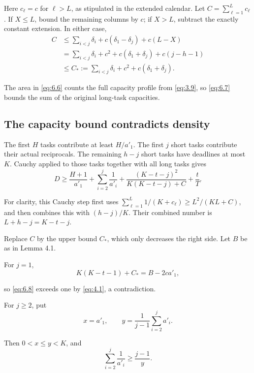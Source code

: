 \documentclass[11pt,a4paper]{article}
\begin{document}
Here \(c_\ell=c\) for \(\ell>L\), as stipulated in the extended calendar. Let \(C=\sum_{\ell=1}^L c_\ell\). If \(X\le L\), bound the remaining columns by \(c\); if \(X>L\), subtract the exactly constant extension. In either case,
\begin{equation}
\begin{aligned}
C
&\le\sum_{i<j}\delta_i+c(\delta_1-\delta_j)+c(L-X)\\
&=\sum_{i<j}\delta_i+c^2+c(\delta_1+\delta_j)+c(j-h-1)\\
&\le C_*:=\sum_{i<j}\delta_i+c^2+c(\delta_1+\delta_j).
\end{aligned}
\tag{6.7}
\label{eq:6.7}
\end{equation}

The area in \eqref{eq:6.6} counts the full capacity profile from \eqref{eq:3.9}, so \eqref{eq:6.7} bounds the sum of the original long-task capacities.

\hypertarget{the-capacity-bound-contradicts-density}{%
\subsection{The capacity bound contradicts density}\label{the-capacity-bound-contradicts-density}}

The first \(H\) tasks contribute at least \(H/a'_1\). The first \(j\) short tasks contribute their actual reciprocals. The remaining \(h-j\) short tasks have deadlines at most \(K\). Cauchy applied to those tasks together with all long tasks gives
\begin{equation}
D\ge
\frac{H+1}{a'_1}+\sum_{i=2}^j\frac1{a'_i}
+\frac{(K-t-j)^2}{K(K-t-j)+C}+\frac tT.
\tag{6.8}
\label{eq:6.8}
\end{equation}

For clarity, this Cauchy step first uses \(\sum_{\ell=1}^L1/(K+c_\ell)\ge L^2/(KL+C)\), and then combines this with \((h-j)/K\). Their combined number is \(L+h-j=K-t-j\).

Replace \(C\) by the upper bound \(C_*\), which only decreases the right side. Let \(B\) be as in Lemma 4.1.

For \(j=1\),
\[
K(K-t-1)+C_*=B-2ca'_1,
\]

so \eqref{eq:6.8} exceeds one by \eqref{eq:4.1}, a contradiction.

For \(j\ge2\), put
\[
x=a'_1,\qquad y=\frac1{j-1}\sum_{i=2}^j a'_i.
\]

Then \(0<x\le y<K\), and
\[
\sum_{i=2}^j\frac1{a'_i}\ge\frac{j-1}{y}.
\]
\end{document}

